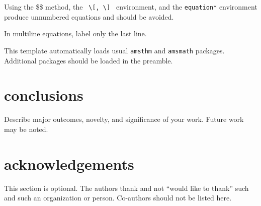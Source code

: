 \documentclass[10pt]{article}
\begin{document}
 Using the \$\$ method, the \verb+ \[, \] + environment, and the \verb+equation*+ environment produce unnumbered equations and should be avoided.

In multiline equations, label only the last line.

This template automatically loads usual \verb+amsthm+ and \verb+amsmath+ packages.  Additional packages should be loaded in the preamble.

\section*{conclusions}
Describe major outcomes, novelty, and significance of your work. Future work may be noted.

\section*{acknowledgements}
This section is optional. The authors thank and not ``would like to thank'' such and such an organization or person. Co-authors should not be listed here.
\end{document}
